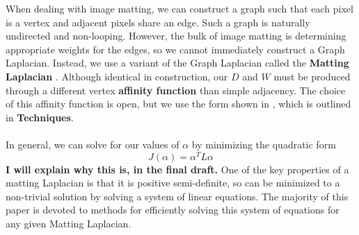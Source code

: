 When dealing with image matting, we can construct a graph such that each pixel is a vertex and adjacent pixels share an edge. Such a graph is naturally undirected and non-looping. However, the bulk of image matting is determining appropriate weights for the edges, so we cannot immediately construct a Graph Laplacian. Instead, we use a variant of the Graph Laplacian called the \textbf{Matting Laplacian} \cite{levin08}. Although identical in construction, our $D$ and $W$ must be produced through a different vertex \textbf{affinity function} than simple adjacency. The choice of this affinity function is open, but we use the form shown in \cite{levin08}, which is outlined in \textbf{Techniques}.
\\\\
In general, we can solve for our values of $\alpha$ by minimizing the quadratic form
\[J(\alpha)=\alpha^T L\alpha\]
\textbf{I will explain why this is, in the final draft.} One of the key properties of a matting Laplacian is that it is positive semi-definite, so can be minimized to a non-trivial solution by solving a system of linear equations. The majority of this paper is devoted to methods for efficiently solving this system of equations for any given Matting Laplacian.